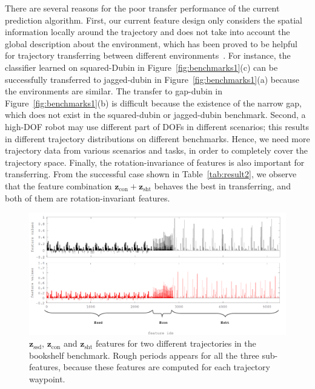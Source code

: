 \documentclass[letterpaper, 10 pt, conference]{ieeeconf}  %
\newcommand{\fssd}{\mbox{$\mathbf z_{\text{ssd}}$}}
\newcommand{\fcon}{\mbox{$\mathbf z_{\text{con}}$}}
\newcommand{\fsht}{\mbox{$\mathbf z_{\text{sht}}$}}
\begin{document}
There are several reasons for the poor transfer performance of the current prediction algorithm. First, our current feature design only considers the spatial information locally around the trajectory and does not take into account the global description about the environment, which has been proved to be helpful for trajectory transferring between different environments~\cite{Jetchev:2013:FMP}. For instance, the classifier learned on squared-Dubin in Figure~\ref{fig:benchmarks1}(c) can be successfully transferred to jagged-dubin in Figure~\ref{fig:benchmarks1}(a) because the environments are similar. The transfer to gap-dubin in Figure~\ref{fig:benchmarks1}(b) is difficult because the existence of the narrow gap, which does not exist in the squared-dubin or jagged-dubin benchmark.  Second, a high-DOF robot may use different part of DOFs in different scenarios; this results in different trajectory distributions on different benchmarks. Hence, we need more trajectory data from various scenarios and tasks, in order to completely cover the trajectory space. Finally, the rotation-invariance of features is also important for transferring. From the successful case shown in Table~\ref{tab:result2}, we observe that the feature combination $\fcon+\fsht$ behaves the best in transferring, and both of them are rotation-invariant features. 


\begin{figure}[t]
\centering
\includegraphics[width=0.76\linewidth]{figure/features.pdf}
\caption{$\fssd$, $\fcon$ and $\fsht$ features for two different trajectories in the bookshelf benchmark. Rough periods appears for all the three sub-features, because these features are computed for each trajectory waypoint.}
\label{fig:features}
\end{figure}
\end{document}
